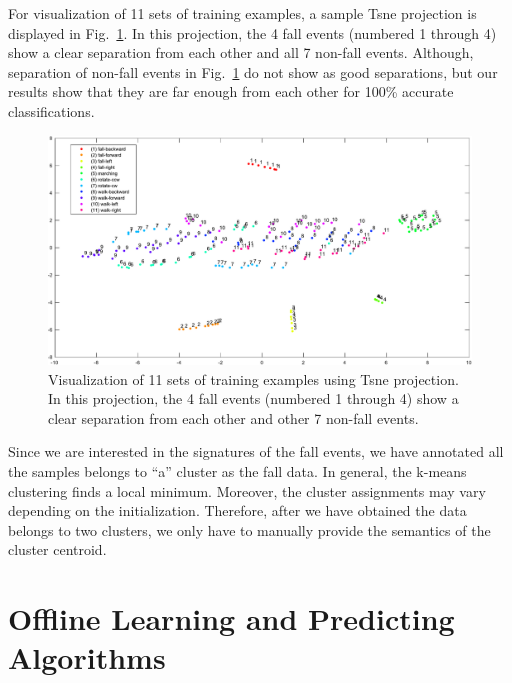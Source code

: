 \documentclass[]{IEEEtran}
\begin{document}
\par
For visualization of 11 sets of training examples, a sample Tsne projection  is displayed in Fig.~\ref{fig:automatic_annotation3}. In this projection, the 4 fall events (numbered 1 through 4) show a clear separation from each other and all 7 non-fall events. Although, separation of non-fall events in Fig.~\ref{fig:automatic_annotation3} do not show as good separations, but our results show that they are far enough from each other for 100\% accurate classifications.

\begin{figure}[!htb]
\centering
\includegraphics[width=\textwidth]{figures/viz_all_training_examples_crop2.pdf} 
\caption{Visualization of 11 sets of training examples using Tsne projection. In this projection, the 4 fall events (numbered 1 through 4) show a clear separation from each other and other 7 non-fall events.}
 \label{fig:automatic_annotation3} 
\end{figure}


Since we are 
interested in the signatures of the fall events, we have annotated all the samples belongs 
to ``a'' cluster as the fall data. In general, the k-means clustering finds a 
local minimum. Moreover, the cluster assignments may vary depending on the 
initialization. Therefore, after we have obtained the data belongs to two clusters, we 
only have to manually provide the semantics of the cluster centroid. 

\section{Offline Learning and Predicting Algorithms}
\label{sec:OffLineLearning}

\end{document}
